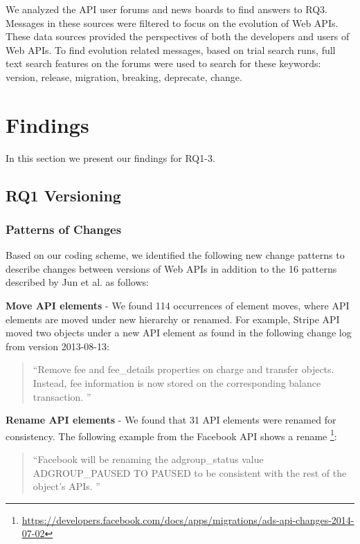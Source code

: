 We analyzed the API user forums and news boards to find answers to RQ3. Messages in these sources were filtered to focus on the evolution of Web APIs. These data sources provided the perspectives of both the developers and users of Web APIs. To find evolution related messages, based on trial search runs, full text search features on the forums were used to search for these keywords: version, release, migration, breaking, deprecate, change.


\section{Findings} %
\label{sec:findings}

In this section we present our findings for RQ1-3.

\subsection{RQ1 Versioning} %
\label{sub:versioning}


\subsubsection{Patterns of Changes}

Based on our coding scheme, we identified the following new change patterns to describe changes between versions of Web APIs in addition to the 16 patterns described by Jun et al. \cite{li_client_2013} as follows:

\textbf{Move API elements} - We found 114 occurrences of element moves, where API elements are moved under new hierarchy or renamed. For example, Stripe API moved two objects under a new API element as found in the following change log from version 2013-08-13:

\small
\begin{quotation}
``Remove fee and fee\_details properties on charge and transfer objects. Instead, fee information is now stored on the corresponding balance transaction.
''\end{quotation}
\normalsize

\textbf{Rename API elements} - We found that 31 API elements were renamed for consistency. The following example from the Facebook API shows a rename \footnote{\url{https://developers.facebook.com/docs/apps/migrations/ads-api-changes-2014-07-02}}:

\small
\begin{quotation}
``Facebook will be renaming the adgroup\_status value ADGROUP\_PAUSED TO PAUSED to be consistent with the rest of the object's APIs.
''\end{quotation}
\normalsize

